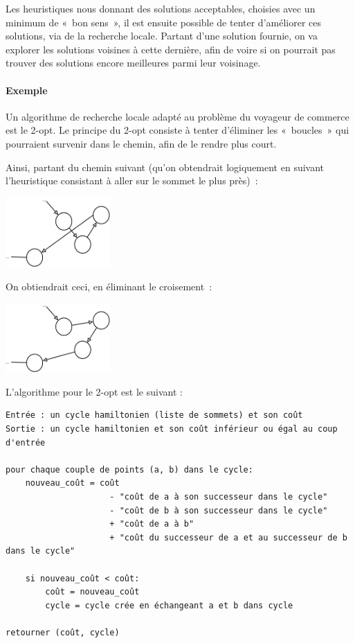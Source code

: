     Les heuristiques nous donnant des solutions acceptables, choisies avec un
    minimum de «~bon sens~», il est ensuite possible de tenter d'améliorer
    ces solutions, via de la recherche locale.
    Partant d'une solution fournie, on va explorer les solutions voisines
    à cette dernière, afin de voire si on pourrait pas trouver des solutions
    encore meilleures parmi leur voisinage.

    \paragraph{Exemple} Un algorithme de recherche locale adapté au problème
    du voyageur de commerce est le 2-opt.
    Le principe du 2-opt consiste à tenter d'éliminer les «~boucles~» qui
    pourraient survenir dans le chemin, afin de le rendre plus court.

    Ainsi, partant du chemin suivant (qu'on obtendrait logiquement en suivant
    l'heuristique consistant à aller sur le sommet le plus près)~:

    \begin{center}
    \includegraphics[width=0.3\textwidth]{graphes/2opt1.png}
    \end{center}

    On obtiendrait ceci, en éliminant le croisement~:

    \begin{center}
    \includegraphics[width=0.3\textwidth]{graphes/2opt2.png}
    \end{center}

    L'algorithme pour le 2-opt est le suivant :
      \begin{lstlisting}
Entrée : un cycle hamiltonien (liste de sommets) et son coût
Sortie : un cycle hamiltonien et son coût inférieur ou égal au coup d'entrée

pour chaque couple de points (a, b) dans le cycle:
    nouveau_coût = coût
                     - "coût de a à son successeur dans le cycle"
                     - "coût de b à son successeur dans le cycle"
                     + "coût de a à b"
                     + "coût du successeur de a et au successeur de b dans le cycle"

    si nouveau_coût < coût:
        coût = nouveau_coût
        cycle = cycle crée en échangeant a et b dans cycle

retourner (coût, cycle)
      \end{lstlisting}


